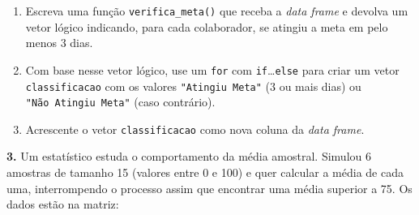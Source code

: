 \documentclass[
  portuguese,
  11pt,
  openany]{book}
\begin{document}
\begin{enumerate}
\def\labelenumi{(\alph{enumi})}
\item
  Escreva uma função \texttt{verifica\_meta()} que receba a \emph{data frame} e devolva um vetor
  lógico indicando, para cada colaborador, se atingiu a meta em pelo menos 3 dias.
\item
  Com base nesse vetor lógico, use um \texttt{for} com \texttt{if}\ldots{}\texttt{else} para criar um vetor
  \texttt{classificacao} com os valores \texttt{"Atingiu\ Meta"} (3 ou mais dias) ou
  \texttt{"Não\ Atingiu\ Meta"} (caso contrário).
\item
  Acrescente o vetor \texttt{classificacao} como nova coluna da \emph{data frame}.
\end{enumerate}

\textbf{3.} Um estatístico estuda o comportamento da média amostral. Simulou 6 amostras de
tamanho 15 (valores entre 0 e 100) e quer calcular a média de cada uma, interrompendo
o processo assim que encontrar uma média superior a 75. Os dados estão na matriz:
\end{document}
